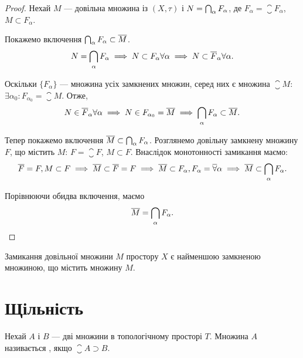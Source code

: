\begin{proof}
Нехай $M$ --- довільна множина із $(X, \tau)$ і
$N = \operatorname*{\bigcap}_\alpha F_\alpha$, де $F_\alpha = \closure F_\alpha$,
$M \subset F_\alpha$.

Покажемо включення $\operatorname*{\bigcap}_\alpha F_\alpha \subset \overline{M}$.
\begin{equation*}
N = \operatorname*{\bigcap}_\alpha F_\alpha \implies
N \subset F_\alpha \forall \alpha \implies
N \subset \overline{F}_\alpha \forall \alpha.
\end{equation*}

Оскільки $\{F_\alpha\}$ --- множина усіх замкнених множин, серед
них є множина $\closure M$: $\exists \alpha_0: F_{\alpha_0} = \closure M$. Отже,
\begin{equation*}
N \in \overline{F}_\alpha \forall \alpha \implies
N \in F_{\alpha_0} = \overline{M} \implies
\operatorname*{\bigcap}_\alpha F_\alpha \subset \overline{M}.
\end{equation*}

Тепер покажемо включення $\overline{M} \subset \operatorname*{\bigcap}_\alpha F_\alpha$.
Розглянемо довільну замкнену множину $F$, що містить $M$:
$F = \closure F$, $M \subset F$. Внаслідок монотонності замикання маємо:
\begin{equation*}
\overline{F} = F, M \subset F \implies
\overline{M} \subset \overline{F} = F \implies
\overline{M} \subset F_\alpha, F_\alpha = \overline{\forall} \alpha \implies
\overline{M} \subset \operatorname*{\bigcap}_\alpha F_\alpha.
\end{equation*}

Порівнюючи обидва включення, маємо
\begin{equation*}
\overline{M} = \operatorname*{\bigcap}_\alpha F_\alpha. \qedhere
\end{equation*}
\end{proof}

\begin{corollary}
Замикання довільної множини $M$ простору
$X$ є найменшою замкненою множиною, що містить
множину $M$.
\end{corollary}

\section{Щільність}

\begin{definition}
Нехай $A$ і $B$ --- дві множини в топологічному
просторі $T$. Множина $A$ називається , якщо
$\closure A \supset B$.
\end{definition}

